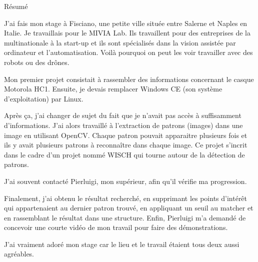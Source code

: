 \documentclass[english,a4paper,11pt]{report}
\begin{document}
	\vspace{1cm}
	\Large{Résumé}
\vspace{5pt}
\normalsize
	\par J\rq{}ai fais mon stage à Fisciano, une petite ville située entre Salerne et Naples en Italie. Je travaillais pour le MIVIA Lab. Ils travaillent pour des entreprises de la multinationale à la start-up et ils sont spécialisés dans la vision assistée par ordinateur et l\rq{}automatisation. Voilà pourquoi on peut les voir travailler avec des robots ou des drônes.
	\par Mon premier projet consistait à rassembler des informations concernant le casque Motorola HC1. Ensuite, je devais remplacer Windows CE (son système d\rq{}exploitation) par Linux.
	\par Après ça, j\rq{}ai changer de sujet du fait que je n\rq{}avait pas accès à suffisamment d\rq{}informations. J\rq{}ai alors travaillé à l\rq{}extraction de patrons (images) dans une image en utilisant OpenCV. Chaque patron pouvait apparaitre plusieurs fois et ils y avait plusieurs patrons à reconnaître dans chaque image. Ce projet  s\rq{}incrit dans le cadre d\rq{}un projet nommé WISCH qui tourne autour de la détection de patrons.
	\par J\rq{}ai souvent contacté Pierluigi, mon supérieur, afin qu\rq{}il vérifie ma progression.
	\par Finalement, j\rq{}ai obtenu le résultat recherché, en supprimant les points d\rq{}intérêt qui appartenaient au dernier patron trouvé, en appliquant un seuil au matcher et en rassemblant le résultat dans une structure. Enfin, Pierluigi m\rq{}a demandé de concevoir une courte vidéo de mon travail pour faire des démonstrations.
	\par J\rq{}ai vraiment adoré mon stage car le lieu et le travail étaient tous deux aussi agréables. 
	
	
	
\end{document}
